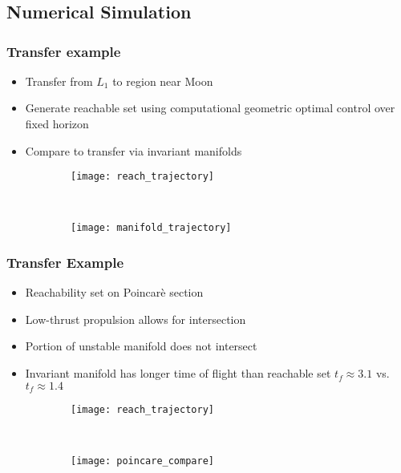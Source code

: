 \section*{}
\subsection*{Numerical Simulation}
\begin{frame} %
\frametitle{Transfer example}
\begin{itemize}
	\item Transfer from \( L_1 \) to region near Moon
	\item Generate reachable set using computational geometric optimal control over fixed horizon
	\item Compare to transfer via invariant manifolds
\end{itemize}
	\begin{figure} 
	\centering 
	\begin{subfigure}[htbp]{0.5\textwidth} 
		\texttt{[image: reach\_trajectory]}  
	\end{subfigure}~
	\begin{subfigure}[htbp]{0.5\textwidth} 
		\texttt{[image: manifold\_trajectory]} 
	\end{subfigure} 
	\end{figure}
\end{frame} %

\begin{frame}%
\frametitle{Transfer Example}
\begin{itemize}
	\item Reachability set on Poincar\`e section
	\item Low-thrust propulsion allows for intersection
	\item Portion of unstable manifold does not intersect
	\item Invariant manifold has longer time of flight than reachable set \( t_f \approx 3.1 \) vs. \( t_f \approx 1.4 \)
\end{itemize}
	\begin{figure} 
	\centering 
	\begin{subfigure}[htbp]{0.5\textwidth} 
		\texttt{[image: reach\_trajectory]}  
	\end{subfigure}~
	\begin{subfigure}[htbp]{0.5\textwidth} 
		\texttt{[image: poincare\_compare]} 
	\end{subfigure} 
	\end{figure}

\end{frame} %